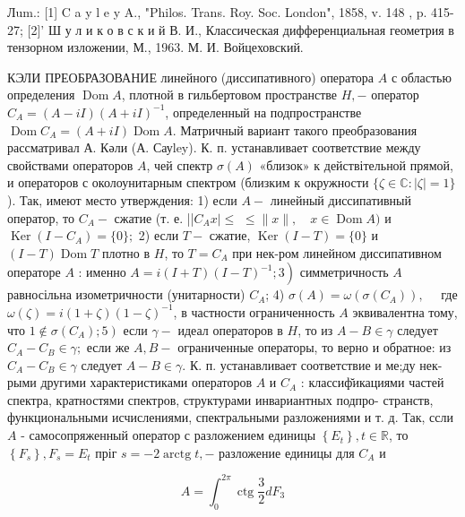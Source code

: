 \documentclass[10pt]{article}
\begin{document}
Лum.: [1] C a y l e y A., "Philos. Trans. Roy. Soc. London", 1858, v. 148 , p. 415-27; [2]' Ш у л и к о в с к и й В. И., Классическая дифференциальная геометрия в тензорном изложении, М., 1963. М. И. Войцеховский.



КЭЛИ ПРЕОБРАЗОВАНИЕ линейного (диссипативного) оператора $A$ с областью определения $\operatorname{Dom} A$, плотной в гильбертовом пространстве $H,-$ оператор $C_{A}=(A-i I)(A+i I)^{-1}$, определенный на подпространстве $\operatorname{Dom} C_{A}=(A+i I) \operatorname{Dom} A$. Матричный вариант такого преобразования рассматривал А. Кәли (А. Сауley). К. п. устанавливает соответствие между свойствами операторов $A$, чей спектр $\sigma(A)$ «близок» к действітельной прямой, и операторов с околоунитарным спектром (близким к окружности $\{\zeta \in \mathbb{C}:|\zeta|=1\}$ ). Так, имеют место утверждения: 1) если $A-$ линейный диссипативный оператор, то $C_{A}-$ сжатие (т. е. ||$C_{A} x \mid \leqslant$ $\leqslant\|x\|, \quad x \in \operatorname{Dom} A)$ и $\operatorname{Ker}\left(I-C_{A}\right)=\{0\} ;$ 2) если $T-$ сжатие, $\operatorname{Ker}(I-T)=\{0\}$ и $(I-T) \operatorname{Dom} T$ плотно в $H$, то $T=C_{A}$ при нек-ром линейном диссипативном операторе $A$ : именно $\left.A=i(I+T)(I-T)^{-1} ; 3\right)$ симметричность $A$ равносільна изометричности (унитарности) $C_{A}$; 4) $\sigma(A)=\omega\left(\sigma\left(C_{A}\right)\right), \quad$ где $\omega(\zeta)=i(1+\zeta)(1-\zeta)^{-1}$, в частности ограниченность $A$ эквивалентна тому, что $\left.1 \notin \sigma\left(C_{A}\right) ; 5\right)$ если $\gamma-$ идеал операторов в $H$, то из $A-B \in \gamma$ следует $C_{A}-C_{B} \in \gamma ;$ если же $A, B-$ ограниченные операторы, то верно и обратное: из $C_{A}-C_{B} \in \gamma$ следует $A-B \in \gamma$. $К$. п. устанавливает соответствие и ме;ду нек-рыми другими характеристиками операторов $A$ и $C_{A}$ : классиф̆икациями частей спектра, кратностями спектров, структурами инвариантных подпро- странств, функциональными исчислениями, спектральными разложениями и т. д. Так, ссли $A$ - самосопряженный оператор с разложением единицы $\left\{E_{t}\right\}, t \in \mathbb{R}$, то $\left\{F_{s}\right\}, F_{s}=E_{t}$ пріг $s=-2 \operatorname{arctg} t,-$ разложение единицы для $C_{A}$ и



\[

A=\int_{0}^{2 \pi} \operatorname{ctg} \frac{3}{2} d F_{3}

\]
\end{document}
